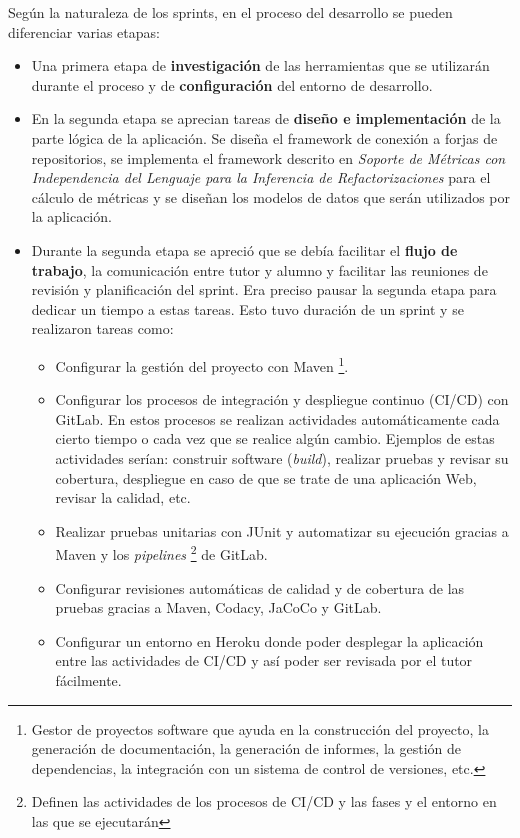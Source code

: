 Según la naturaleza de los sprints, en el proceso del desarrollo se pueden diferenciar varias etapas:
\begin{itemize}
	\item  Una primera etapa de \textbf{investigación} de las herramientas que se utilizarán durante el proceso y de \textbf{configuración} del entorno de desarrollo.
	\item En la segunda etapa se aprecian tareas de \textbf{diseño e implementación} de la parte lógica de la aplicación. Se diseña el framework de conexión a forjas de repositorios, se implementa el framework descrito en \textit{Soporte de Métricas con Independencia del Lenguaje para la Inferencia de Refactorizaciones}  \citep{marticorena_sanchez_soporte_2005} para el cálculo de métricas y se diseñan los modelos de datos que serán utilizados por la aplicación.
	\item Durante la segunda etapa se apreció que se debía facilitar el \textbf{flujo de trabajo}, la comunicación entre tutor y alumno y facilitar las reuniones de revisión y planificación del sprint. Era preciso pausar la segunda etapa para dedicar un tiempo a estas tareas. Esto tuvo duración de un sprint y se realizaron tareas como:
		\begin{itemize}
			\item Configurar la gestión del proyecto con Maven \footnote{Gestor de proyectos software que ayuda en la construcción del proyecto, la generación de documentación, la generación de informes, la gestión de dependencias, la integración con un sistema de control de versiones, etc.}.
			\item Configurar los procesos de integración y despliegue continuo (CI/CD) con GitLab. En estos procesos se realizan actividades automáticamente cada cierto tiempo o cada vez que se realice algún cambio. Ejemplos de estas actividades serían: construir software (\textit{build}), realizar pruebas y revisar su cobertura, despliegue en caso de que se trate de una aplicación Web, revisar la calidad, etc.
			\item Realizar pruebas unitarias con JUnit y automatizar su ejecución gracias a Maven y los \textit{pipelines} \footnote{Definen las actividades de los procesos de CI/CD y las fases y el entorno en las que se ejecutarán} de GitLab.
			\item Configurar revisiones automáticas de calidad y de cobertura de las pruebas gracias a Maven, Codacy, JaCoCo y GitLab.
			\item Configurar un entorno en Heroku donde poder desplegar la aplicación entre las actividades de CI/CD y así poder ser revisada por el tutor fácilmente.

\end{itemize}
\end{itemize}
